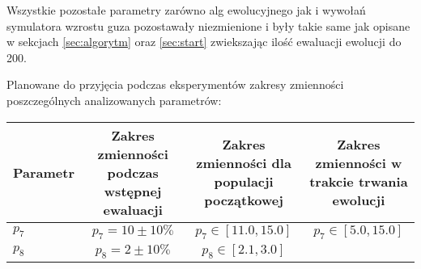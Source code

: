 \documentclass[]{article}
\begin{document}
Wszystkie pozostałe parametry zarówno alg ewolucyjnego jak i wywołań
symulatora wzrostu guza pozostawały niezmienione i były takie same jak
opisane w sekcjach \ref{sec:algorytm} oraz \ref{sec:start} zwiekszając
ilość ewaluacji ewolucji do 200.

Planowane do przyjęcia podczas eksperymentów zakresy zmienności
poszczególnych analizowanych parametrów:

\begin{longtable}[c]{@{}lccc@{}}
\toprule
\begin{minipage}[b]{0.13\columnwidth}\raggedright\strut
Parametr
\strut\end{minipage} &
\begin{minipage}[b]{0.26\columnwidth}\centering\strut
Zakres zmienności podczas wstępnej ewaluacji
\strut\end{minipage} &
\begin{minipage}[b]{0.24\columnwidth}\centering\strut
Zakres zmienności dla populacji początkowej
\strut\end{minipage} &
\begin{minipage}[b]{0.26\columnwidth}\centering\strut
Zakres zmienności w trakcie trwania ewolucji
\strut\end{minipage}\tabularnewline
\midrule
\endhead
\begin{minipage}[t]{0.13\columnwidth}\raggedright\strut
\(p_7\)
\strut\end{minipage} &
\begin{minipage}[t]{0.26\columnwidth}\centering\strut
\(p_7 = 10 \pm 10\%\)
\strut\end{minipage} &
\begin{minipage}[t]{0.24\columnwidth}\centering\strut
\(p_7 \in [11.0,15.0]\)
\strut\end{minipage} &
\begin{minipage}[t]{0.26\columnwidth}\centering\strut
\(p_7 \in [5.0,15.0]\)
\strut\end{minipage}\tabularnewline
\begin{minipage}[t]{0.13\columnwidth}\raggedright\strut
\(p_8\)
\strut\end{minipage} &
\begin{minipage}[t]{0.26\columnwidth}\centering\strut
\(p_8 = 2 \pm 10 \%\)
\strut\end{minipage} &
\begin{minipage}[t]{0.24\columnwidth}\centering\strut
\(p_{8} \in [2.1,3.0]\)
\strut\end{minipage} &
\begin{minipage}[t]{0.26\columnwidth}\centering\strut

\end{minipage}
\end{longtable}
\end{document}
